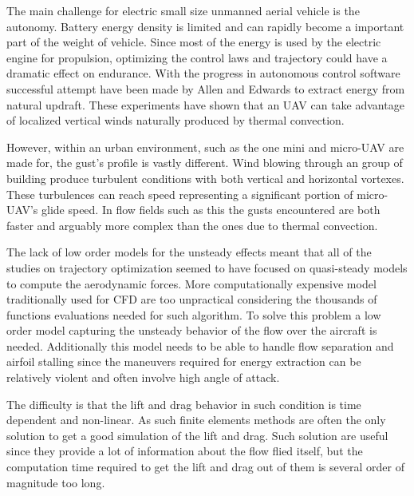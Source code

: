  \label{subsec:dynsoar}

The main challenge for electric small size unmanned aerial vehicle is the autonomy.
Battery energy density is limited and can rapidly become a important part of the weight of vehicle.
Since most of the energy is used by the electric engine for propulsion, optimizing the control laws and trajectory could have a dramatic effect on endurance. 
With the progress in autonomous control software successful attempt have been made by Allen \cite{flight_test_soaring_NASA} and Edwards \cite{flight_test_soaring_NCU} to extract energy from natural updraft.
These experiments have shown that an UAV can take advantage of localized vertical winds naturally produced by thermal convection.

\par However, within an urban environment, such as the one mini and micro-UAV are made for, the gust's profile is vastly different. 
Wind blowing through an group of building produce turbulent conditions with both vertical and horizontal vortexes.
These turbulences can reach speed representing a significant portion of micro-UAV's glide speed. 
In flow fields such as this the gusts encountered are both faster and arguably more complex than the ones due to thermal convection.

\par The lack of low order models for the unsteady effects meant that all of the studies on trajectory optimization seemed to have focused on quasi-steady models to compute the aerodynamic forces.
More computationally expensive model traditionally used for CFD are too unpractical considering the thousands of functions evaluations needed for such algorithm.
To solve this problem a low order model capturing the unsteady behavior of the flow over the aircraft is needed.
Additionally this model needs to be able to handle flow separation and airfoil stalling since the maneuvers required for energy extraction can be relatively violent and often involve high angle of attack.



\par The difficulty is that the lift and drag behavior in such condition is time dependent and non-linear.
As such finite elements methods are often the only solution to get a good simulation of the lift and drag.
Such solution are useful since they provide a lot of information about the flow flied itself, but the computation time required to get the lift and drag out of them is several order of magnitude too long.

